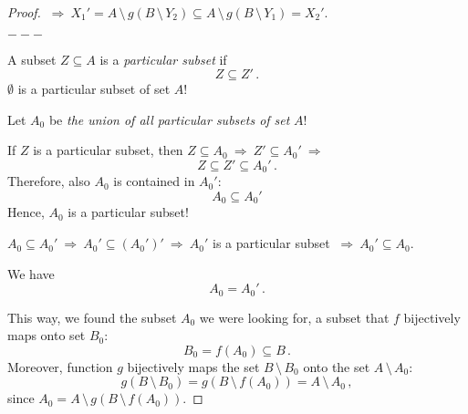 \documentclass[11pt,paper=b5,footinclude,headinclude]{scrbook} %
\def\sledi {{~\Rightarrow~}}
\def\brez {{\,\setminus\,}}
\theoremstyle{remark}
\theoremstyle{definition} %
\theoremstyle{theorem} %
\begin{document}
\begin{proof}
$\sledi X_1' = A\brez g(B\brez Y_2)\subseteq A\brez g(B\brez Y_1)= X_2'$.

$---$

A subset $Z\subseteq A$ is a {\em particular subset} if
$$Z\subseteq Z'\,.$$
$\emptyset$ is a particular subset of set $A$!

Let $A_0$ be {\em the union of all particular subsets of set} $A$!

If $Z$ is a particular subset, then $Z\subseteq A_0\sledi Z'\subseteq A_0'\sledi$
$$Z\subseteq Z'\subseteq A_0'\,.$$
Therefore, also $A_0$ is contained in $A_0'$:
$$A_0\subseteq A_0'$$
Hence, $A_0$ is a particular subset!

$A_0\subseteq A_0' \sledi A_0'\subseteq (A_0')'\sledi
A_0'$ is a particular subset $\sledi A_0'\subseteq A_0$.

We have $$A_0 = A_0'\,.$$

This way, we found the subset $A_0$ we were looking for, a subset that $f$ bijectively maps
onto set $B_0$:
$$B_0 = f(A_0)\subseteq B\,.$$
Moreover, function $g$ bijectively maps the set $B\brez B_0$ onto the set $A\brez A_0$:
$$g(B\brez B_0) = g(B\brez f(A_0)) = A\brez A_0\,,$$
since $A_0 = A\brez g(B\brez f(A_0))$.
\end{proof}
\end{document}
